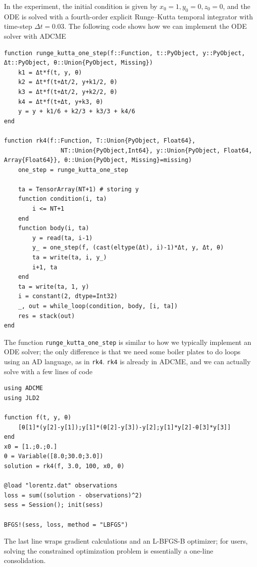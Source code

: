 \documentclass[3p,preprint,12pt]{elsarticle}
\begin{document}
In the experiment, the initial condition is given by $x_0 = 1, y_0= 0, z_0 = 0$, and the ODE is solved with a fourth-order explicit Runge–Kutta temporal integrator with time-step $\Delta t = 0.03$. The following code shows how we can implement the ODE solver with ADCME

\begin{verbatim}
function runge_kutta_one_step(f::Function, t::PyObject, y::PyObject, Δt::PyObject, θ::Union{PyObject, Missing})
    k1 = Δt*f(t, y, θ)
    k2 = Δt*f(t+Δt/2, y+k1/2, θ)
    k3 = Δt*f(t+Δt/2, y+k2/2, θ)
    k4 = Δt*f(t+Δt, y+k3, θ)
    y = y + k1/6 + k2/3 + k3/3 + k4/6
end

function rk4(f::Function, T::Union{PyObject, Float64}, 
                NT::Union{PyObject,Int64}, y::Union{PyObject, Float64, Array{Float64}}, θ::Union{PyObject, Missing}=missing)
    one_step = runge_kutta_one_step
    
    ta = TensorArray(NT+1) # storing y
    function condition(i, ta)
        i <= NT+1
    end
    function body(i, ta)
        y = read(ta, i-1)
        y_ = one_step(f, (cast(eltype(Δt), i)-1)*Δt, y, Δt, θ)
        ta = write(ta, i, y_)
        i+1, ta 
    end
    ta = write(ta, 1, y)
    i = constant(2, dtype=Int32)
    _, out = while_loop(condition, body, [i, ta])
    res = stack(out)
end
\end{verbatim}
The function \texttt{runge\_kutta\_one\_step} is similar to how we typically implement an ODE solver; the only difference is that we need some boiler plates to do loops using an AD language, as in \texttt{rk4}. \texttt{rk4} is already in ADCME, and we can actually solve  with a few lines of code
\begin{verbatim}
using ADCME
using JLD2 

function f(t, y, θ)
    [θ[1]*(y[2]-y[1]);y[1]*(θ[2]-y[3])-y[2];y[1]*y[2]-θ[3]*y[3]]
end
x0 = [1.;0.;0.]
θ = Variable([8.0;30.0;3.0])
solution = rk4(f, 3.0, 100, x0, θ)

@load "lorentz.dat" observations
loss = sum((solution - observations)^2)
sess = Session(); init(sess)

BFGS!(sess, loss, method = "LBFGS")
\end{verbatim}
The last line wraps gradient calculations and an L-BFGS-B optimizer; for users, solving the constrained optimization problem is essentially a one-line consolidation. 
\end{document}
